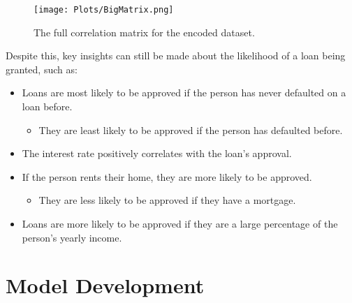 \begin{figure}[H]
    \centering
    \texttt{[image: Plots/BigMatrix.png]}
    \caption{The full correlation matrix for the encoded dataset.}
    \label{fig:BigMatrix}
\end{figure}



Despite this, key insights can still be made about the likelihood of a loan being granted, such as:

\begin{itemize}
    \item Loans are most likely to be approved if the person has never defaulted on a loan before.
    \begin{itemize}
        \item They are least likely to be approved if the person has defaulted before.
    \end{itemize}
    \item The interest rate positively correlates with the loan's approval.
    \item If the person rents their home, they are more likely to be approved.
    \begin{itemize}
        \item They are less likely to be approved if they have a mortgage.
    \end{itemize}
    \item Loans are more likely to be approved if they are a large percentage of the person's yearly income.
\end{itemize}

\section{Model Development}\label{sec:Development}
